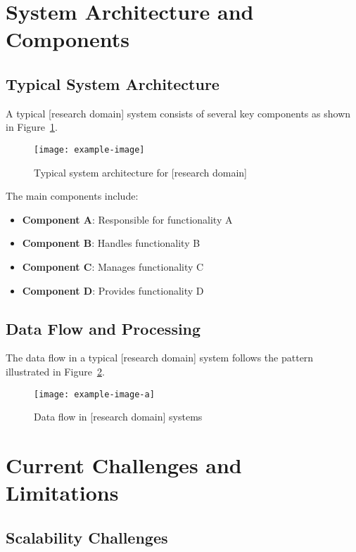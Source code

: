 \section{System Architecture and Components}

\subsection{Typical System Architecture}

A typical [research domain] system consists of several key components as shown in Figure~\ref{fig:system-architecture}.

\begin{figure}[!htb]
    \centering
    \texttt{[image: example-image]}
    \caption{Typical system architecture for [research domain]}
    \label{fig:system-architecture}
\end{figure}

The main components include:
\begin{itemize}
    \item \textbf{Component A}: Responsible for functionality A
    \item \textbf{Component B}: Handles functionality B
    \item \textbf{Component C}: Manages functionality C
    \item \textbf{Component D}: Provides functionality D
\end{itemize}

\subsection{Data Flow and Processing}

The data flow in a typical [research domain] system follows the pattern illustrated in Figure~\ref{fig:data-flow}.

\begin{figure}[!htb]
    \centering
    \texttt{[image: example-image-a]}
    \caption{Data flow in [research domain] systems}
    \label{fig:data-flow}
\end{figure}

\section{Current Challenges and Limitations}

\subsection{Scalability Challenges}

